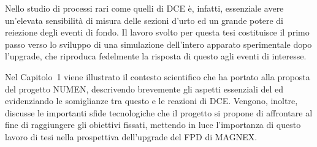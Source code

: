 Nello studio di processi rari come quelli di DCE è, infatti, essenziale avere un'elevata sensibilità di misura delle sezioni d'urto ed un grande potere di reiezione degli eventi di fondo. 
Il lavoro svolto per questa tesi costituisce il primo passo verso lo sviluppo di una simulazione dell'intero apparato sperimentale dopo l'upgrade, che riproduca fedelmente la risposta di questo agli eventi di interesse.
 


Nel Capitolo~1 viene illustrato il contesto scientifico che ha portato alla proposta del progetto NUMEN, descrivendo brevemente gli aspetti essenziali del \doppiobeta{} ed evidenziando le somiglianze tra questo e le reazioni di DCE.
Vengono, inoltre, discusse le importanti sfide tecnologiche che il progetto si propone di affrontare al fine di raggiungere gli obiettivi fissati, mettendo in luce l'importanza di questo lavoro di tesi nella prospettiva dell'upgrade del FPD di MAGNEX.


